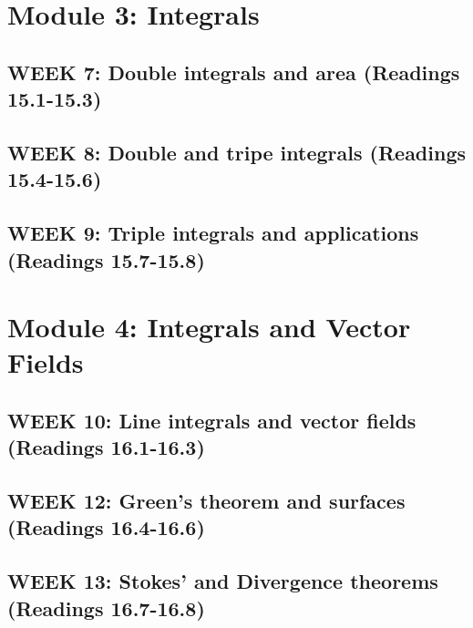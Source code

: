 \documentclass[12pt]{article}
\begin{document}
\section{Module 3: Integrals}
\subsection{WEEK 7: Double integrals and area (Readings 15.1-15.3)}

\subsection{WEEK 8: Double and tripe integrals (Readings 15.4-15.6)}

\subsection{WEEK 9: Triple integrals and applications (Readings 15.7-15.8)}

\pagebreak
\section{Module 4: Integrals and Vector Fields}
\subsection{WEEK 10: Line integrals and vector fields (Readings 16.1-16.3)}

\subsection{WEEK 12: Green's theorem and surfaces (Readings 16.4-16.6)}

\subsection{WEEK 13: Stokes' and Divergence theorems (Readings 16.7-16.8)}
\end{document}

